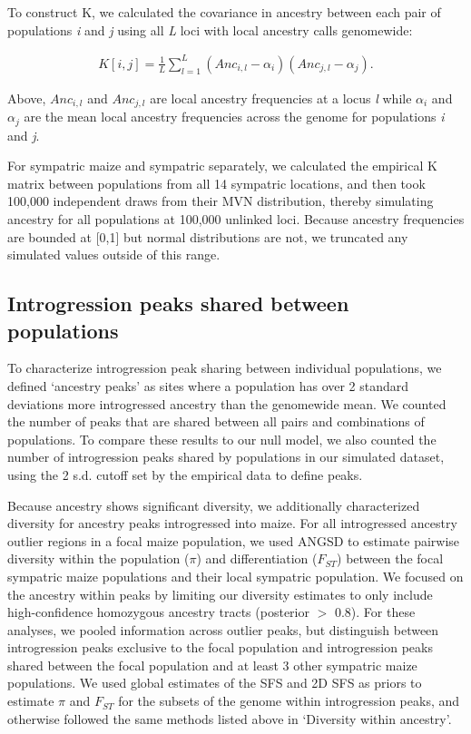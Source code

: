 To construct K, we calculated the covariance in ancestry between each pair of populations \textit{i} and \textit{j}  using all \textit{L} loci with local ancestry calls genomewide:

\begin{align*}
K[i, j] = \frac{1}{L} \sum_{l=1}^{L} (Anc_{i,l} - \alpha_i)(Anc_{j,l} - \alpha_j).
\end{align*}

Above, $Anc_{i,l}$ and $Anc_{j,l}$ are local ancestry frequencies at a locus \textit{l} while $\alpha_i$ and $\alpha_j$ are the mean local ancestry frequencies across the genome for populations \textit{i} and \textit{j}.

For sympatric maize and sympatric \mexicana separately, we calculated the empirical K matrix between populations from all 14 sympatric locations, and then took 100,000 independent draws from their MVN distribution, thereby simulating \mexicana ancestry for all populations at 100,000 unlinked loci. 
Because ancestry frequencies are bounded at [0,1] but normal distributions are not, we truncated any simulated values outside of this range.

\subsection*{Introgression peaks shared between populations}
To characterize introgression peak sharing between individual populations, we defined ‘ancestry peaks' as sites where a population has over 2 standard deviations more introgressed ancestry than the genomewide mean. 
We counted the number of peaks that are shared between all pairs and combinations of populations. 
To compare these results to our null model, we also counted the number of introgression peaks shared by populations in our simulated dataset, using the 2 s.d. cutoff set by the empirical data to define peaks.

Because \mexicana ancestry shows significant diversity, we additionally characterized diversity for \mexicana ancestry peaks introgressed into maize. 
For all introgressed ancestry outlier regions in a focal maize population, we used ANGSD to estimate pairwise diversity within the population ($\pi$) and differentiation ($F_{ST}$) between the focal sympatric maize populations and their local sympatric \mexicana population.
We focused on the \mexicana ancestry within peaks by limiting our diversity estimates to only include high-confidence homozygous \mexicana ancestry tracts (posterior $>$ 0.8). 
For these analyses, we pooled information across outlier peaks, but distinguish between introgression peaks exclusive to the focal population and introgression peaks shared between the focal population and at least 3 other sympatric maize populations.
We used global estimates of the SFS and 2D SFS as priors to estimate $\pi$ and $F_{ST}$ for the subsets of the genome within introgression peaks, and otherwise followed the same methods listed above in ‘Diversity within ancestry'. 

